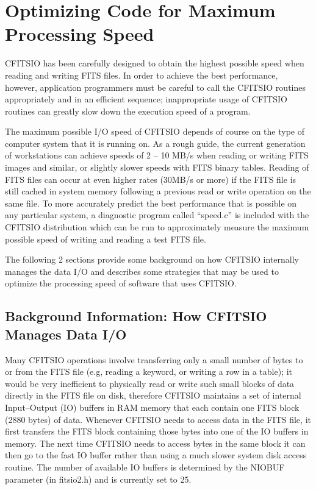\documentclass[11pt]{book}
\begin{document}
\section{Optimizing Code for Maximum Processing Speed}

CFITSIO has been carefully designed to obtain the highest possible
speed when reading and writing FITS files.  In order to achieve the
best performance, however, application programmers must be careful to
call the CFITSIO routines appropriately and in an efficient sequence;
inappropriate usage of CFITSIO routines can greatly slow down the
execution speed of a program.

The maximum possible I/O speed of CFITSIO depends of course on the type
of computer system that it is running on.  As a rough guide, the
current generation of workstations can achieve speeds of 2 -- 10 MB/s
when reading or writing FITS images and similar, or slightly slower
speeds with FITS binary tables.  Reading of FITS files can occur at
even higher rates (30MB/s or more) if the FITS file is still cached in
system memory following a previous read or write operation on the same
file.  To more accurately predict the best performance that is possible
on any particular system, a diagnostic program called ``speed.c'' is
included with the CFITSIO distribution which can be run to
approximately measure the maximum possible speed of writing and reading
a test FITS file.

The following 2 sections provide some background on how CFITSIO
internally manages the data I/O and describes some strategies that may
be used to optimize the processing speed of software that uses
CFITSIO.


\subsection{Background Information: How CFITSIO Manages Data I/O}

Many CFITSIO operations involve transferring only a small number of
bytes to or from the FITS file (e.g, reading a keyword, or writing a
row in a table); it would be very inefficient to physically read or
write such small blocks of data directly in the FITS file on disk,
therefore CFITSIO maintains a set of internal Input--Output (IO)
buffers in RAM memory that each contain one FITS block (2880 bytes) of
data.  Whenever CFITSIO needs to access data in the FITS file, it first
transfers the FITS block containing those bytes into one of the IO
buffers in memory.  The next time CFITSIO needs to access bytes in the
same block it can then go to the fast IO buffer rather than using a
much slower system disk access routine.  The number of available IO
buffers is determined by the NIOBUF parameter (in fitsio2.h) and is
currently set to 25.
\end{document}
